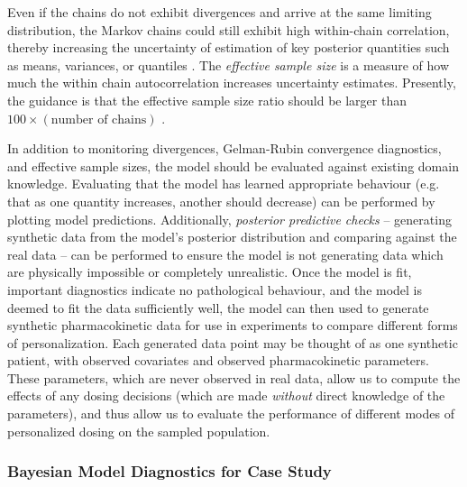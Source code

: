 Even if the chains do not exhibit divergences and arrive at the same limiting distribution, the Markov chains could still exhibit high within-chain correlation, thereby increasing the uncertainty of estimation of key posterior quantities such as means, variances, or quantiles \cite{brooks2011handbook}.  The \textit{effective sample size} is a measure of how much the within chain autocorrelation increases uncertainty estimates.  Presently, the guidance is that the effective sample size ratio should be larger than $100 \times (\mbox{number of chains})$ \cite{vehtari2019rank}.

In addition to monitoring divergences, Gelman-Rubin convergence diagnostics, and effective sample sizes, the model should be evaluated against existing domain knowledge.  Evaluating that the model has learned appropriate  behaviour (e.g. that as one quantity increases, another should decrease) can be performed by plotting model predictions.  Additionally, \textit{posterior predictive checks} -- generating synthetic data  from the model's posterior distribution and comparing against the real data -- can be performed to ensure the model is not generating data which are physically impossible or completely unrealistic. Once the model is fit, important diagnostics indicate no pathological behaviour, and the model is deemed to fit the data sufficiently well, the model can then used to generate synthetic pharmacokinetic data for use in experiments to compare different forms of personalization. Each generated data point may be thought of as one synthetic patient, with observed covariates and observed pharmacokinetic parameters. These parameters, which are never observed in real data, allow us to compute the effects of any dosing decisions (which are made \textit{without} direct knowledge of the parameters), and thus allow us to evaluate the performance of different modes of personalized dosing on the sampled population. 

\subsubsection{Bayesian Model Diagnostics for Case Study}


